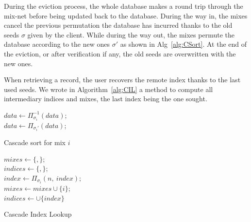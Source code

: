 \documentclass[USenglish,oneside,twocolumn]{article}
\begin{document}
During the eviction process, the whole database makes a round trip through the mix-net before being updated back to the database. During the way in, the mixes cancel the previous permutation the database has incurred thanks to the old seeds $\sigma$ given by the client. While during the way out, the mixes permute the database according to the new ones $\sigma'$ as shown in Alg~\ref{alg:CSort}. At the end of the eviction, or after verification if any, the old seeds are overwritten with the new ones.

When retrieving a record, the user recovers the remote index thanks to the last used seeds. We wrote in Algorithm~\ref{alg:CIL} a method to compute all intermediary indices and mixes, the last index being the one sought.

\begin{algorithm}
\DontPrintSemicolon
{}
{
$data \gets \Pi^{-1}_{\sigma_i}\left ( data \right )$;\\
}
\Else
{
$data \gets \Pi_{\sigma_i'}\left ( data \right )$;\\
}
\caption{Cascade sort for mix $i$}
\label{alg:CSort}
\end{algorithm}

\begin{algorithm}
\DontPrintSemicolon
{}
$mixes \gets \{,\}$;\\
$indices \gets \{,\}$;\\
{
	$index \gets {\Pi}_{\sigma_i}(n,\ index)$;\\
	$mixes \gets mixes \cup \{i\}$;\\
	$indices \gets \cup \{index\}$
}
\caption{Cascade Index Lookup}
\label{alg:CIL}
\end{algorithm}
\end{document}

